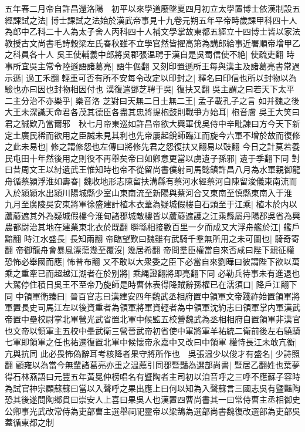 五年春二月帝自許昌還洛陽　初平以來學道廢墜夏四月初立太學置博士依漢制設五經課試之法|{
	博士課試之法始於漢武帝事見十九卷元朔五年平帝時歲課甲科四十人為郎中乙科二十人為太子舍人丙科四十人補文學掌故東都五經立十四博士皆以家法教授古文尚書毛詩穀梁左氏春秋雖不立學官然皆擢高第為講郎給事近署順帝增甲乙之科員各十人}
吳王使輔義中郎將吳郡張温聘于漢自是吳蜀信使不絶|{
	使疏吏翻}
時事所宜吳主常令陸遜語諸葛亮|{
	語牛倨翻}
又刻印置遜所王每與漢主及諸葛亮書常過示遜|{
	過工禾翻}
輕重可否有所不安每令改定以印封之|{
	釋名曰印信也所以封物以為驗也亦曰因也封物相因付也}
漢復遣鄧芝聘于吳|{
	復扶又翻}
吳主謂之曰若天下太平二主分治不亦樂乎|{
	樂音洛}
芝對曰天無二日土無二王|{
	孟子載孔子之言}
如并魏之後大王未深識天命君各茂其德臣各盡其忠將提枹鼓則戰爭方始耳|{
	枹音膚}
吳王大笑曰君之誠欵乃當爾邪　秋七月帝東巡如許昌帝欲大興軍伐吳侍中辛毗諫曰方今天下新定土廣民稀而欲用之臣誠未見其利也先帝屢起銳師臨江而旋今六軍不增於故而復修之此未易也|{
	修之謂修怨也左傳曰將修先君之怨復扶又翻易以豉翻}
今日之計莫若養民屯田十年然後用之則役不再舉矣帝曰如卿意更當以虜遺子孫邪|{
	遺于季翻下同}
對曰昔周文王以紂遺武王惟知時也帝不從留尚書僕射司馬懿鎮許昌八月為水軍親御龍舟循蔡潁浮淮如夀春|{
	魏收地形志陳留扶溝縣有蔡河水經蔡河自陳留浚儀東南流而入於潁潁水出潁川陽城縣少室山東南流至新陽與蔡河合又東南至慎縣東南入于淮}
九月至廣陵吳安東將軍徐盛建計植木衣葦為疑城假樓自石頭至于江乘|{
	植木於内以蘆䕠遮其外為疑城假樓今淮甸諸郡城敵樓皆以蘆䕠遮護之江乘縣屬丹陽郡吳省為興農都尉治其地在建業東北衣於既翻}
聨緜相接數百里一夕而成又大浮舟艦於江|{
	艦戶黯翻}
時江水盛長|{
	長知兩翻}
帝臨望歎曰魏雖有武騎千羣無所用之未可圖也|{
	騎奇寄翻}
帝御龍舟會暴風漂蕩幾至覆沒|{
	幾居希翻}
帝問羣臣權當自來否咸曰陛下親征權恐怖必舉國而應|{
	怖普布翻}
又不敢以大衆委之臣下必當自來劉曄曰彼謂陛下欲以萬乘之重牽已而超越江湖者在於别將|{
	乘䋲證翻將即亮翻下同}
必勒兵待事未有進退也大駕停住積日吳王不至帝乃旋師是時曹休表得降賊辭孫權已在濡須口|{
	降戶江翻下同}
中領軍衛臻曰|{
	晉百官志曰漢建安四年魏武丞相府置中領軍文帝踐祚始置領軍將軍置長史司馬江左以後資重者為領軍將軍資輕者為中領軍沈約志曰領軍掌内軍漢武帝置中壘校尉掌北軍營光武省置北軍中候監五校營魏武為丞相相府自置領軍非漢官也文帝以領軍主五校中壘武衛三營晉武帝初省使中軍將軍羊祐統二衛前後左右驍騎七軍即領軍之任也祐遷復置北軍中候懷帝永嘉中又改曰中領軍}
權恃長江未敢亢衡|{
	亢與抗同}
此必畏怖偽辭耳考核降者果守將所作也　吳張温少以俊才有盛名|{
	少詩照翻}
顧雍以為當今無輩諸葛亮亦重之温薦引同郡暨豔為選部尚書|{
	暨居乙翻姓也葉夢得石林燕語曰元豐五年黃冕仲榜唱名有暨陶者主司初以洎音呼之三呼不應蘇子容時為試官神宗顧蘇蘇曰當以入聲呼之果出應上曰何以知為入聲蘇言三國志吳有暨豔陶恐其後遂問陶鄉貫曰崇安人上喜曰果吳人也漢置四曹尚書其一曰常侍曹主丞相御史公卿事光武改常侍為吏部曹主選舉祠祀靈帝以梁鵠為選部尚書魏復改選部為吏部吳蓋循東都之制}
